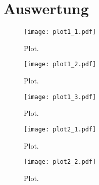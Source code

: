 \section{Auswertung}
\label{sec:Auswertung}

\begin{figure}
  \centering
  \texttt{[image: plot1\_1.pdf]}
  \caption{Plot.}
  \label{fig:plot}
\end{figure}

\begin{figure}
  \centering
  \texttt{[image: plot1\_2.pdf]}
  \caption{Plot.}
  \label{fig:plot}
\end{figure}

\begin{figure}
  \centering
  \texttt{[image: plot1\_3.pdf]}
  \caption{Plot.}
  \label{fig:plot}
\end{figure}

\begin{figure}
  \centering
  \texttt{[image: plot2\_1.pdf]}
  \caption{Plot.}
  \label{fig:plot}
\end{figure}

\begin{figure}
  \centering
  \texttt{[image: plot2\_2.pdf]}
  \caption{Plot.}
  \label{fig:plot}
\end{figure}